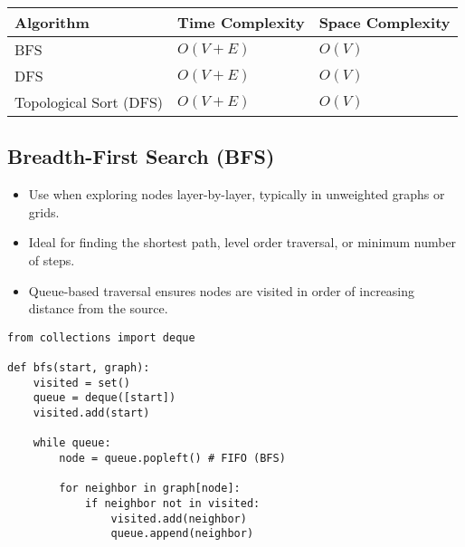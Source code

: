 \begin{summary}
    \begin{center}
        \begin{tabular}{lll}
            \toprule
            \textbf{Algorithm} & \textbf{Time Complexity} & \textbf{Space Complexity} \\
            \midrule
            BFS & $O(V + E)$ & $O(V)$ \\
            \midrule
            DFS & $O(V + E)$ & $O(V)$ \\
            \midrule
            Topological Sort (DFS) & $O(V + E)$ & $O(V)$ \\
        \end{tabular}
    \end{center}
\end{summary}

\subsection{Breadth-First Search (BFS)}
\begin{summary}
    \begin{itemize}
        \item Use when exploring nodes layer-by-layer, typically in unweighted graphs or grids.
        \item Ideal for finding the shortest path, level order traversal, or minimum number of steps.
        \item Queue-based traversal ensures nodes are visited in order of increasing distance from the source.
    \end{itemize}
\end{summary}

\begin{algo}
\begin{lstlisting}
from collections import deque

def bfs(start, graph):
    visited = set()
    queue = deque([start])
    visited.add(start)

    while queue:
        node = queue.popleft() # FIFO (BFS)

        for neighbor in graph[node]:
            if neighbor not in visited:
                visited.add(neighbor)
                queue.append(neighbor)
\end{lstlisting}
\end{algo}
\newpage

